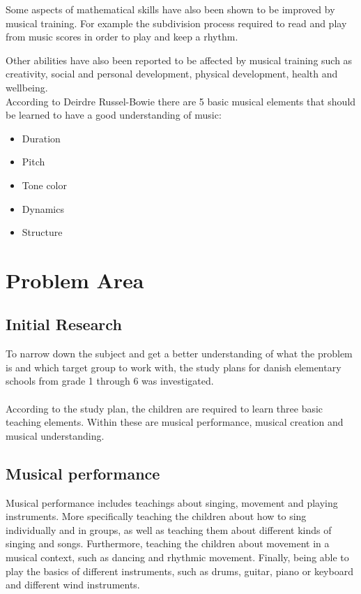 Some aspects of mathematical skills have also been shown to be improved by musical training. For example the subdivision process required to read and play from music scores in order to play and keep a rhythm\cite{powerOfMusic}.

Other abilities have also been reported to be affected by musical training such as creativity, social and personal development, physical development, health and wellbeing\cite{powerOfMusic}.\\

According to Deirdre Russel-Bowie there are 5 basic musical elements that should be learned to have a good understanding of music\cite{primaryArts}:
\begin{itemize}\label{list:basicMusic}
	\item Duration
	\item Pitch
	\item Tone color
	\item Dynamics
	\item Structure
\end{itemize}

\section{Problem Area}

	\subsection{Initial Research}
	To narrow down the subject and get a better understanding of what the problem is and which target group to work with, the study plans for danish elementary schools from grade 1 through 6 was investigated.\\
	\\
	According to the study plan, the children are required to learn three basic teaching elements. Within these are musical performance, musical creation and musical understanding.
	
	\subsection*{Musical performance}
	Musical performance includes teachings about singing, movement and playing instruments. More specifically teaching the children about how to sing individually and in groups, as well as teaching them about different kinds of singing and songs. Furthermore, teaching the children about movement in a musical context, such as dancing and rhythmic movement. Finally, being able to play the basics of different instruments, such as drums, guitar, piano or keyboard and different wind instruments.
	

